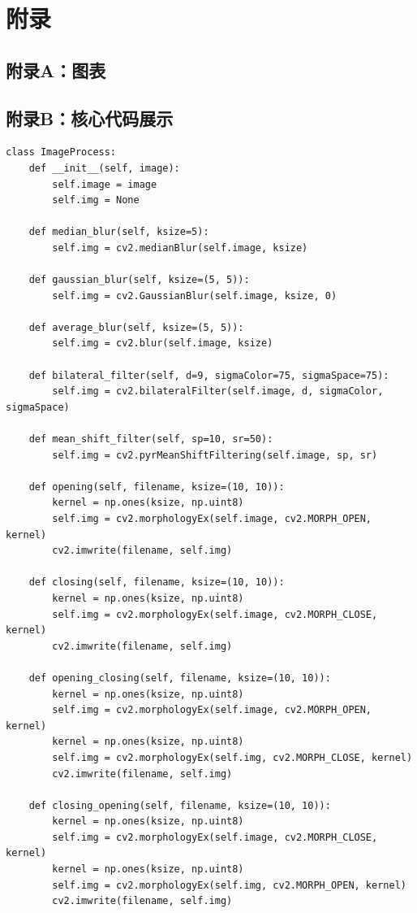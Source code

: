 \documentclass[12pt,hyperref,a4paper,UTF8]{ctexart}
\begin{document}
{{\section{附录}
\subsection*{附录A：图表}


\subsection*{附录B：核心代码展示}


\begin{mdframed}[style=codebox]
\begin{lstlisting}
class ImageProcess:
    def __init__(self, image):
        self.image = image
        self.img = None

    def median_blur(self, ksize=5):
        self.img = cv2.medianBlur(self.image, ksize)

    def gaussian_blur(self, ksize=(5, 5)):
        self.img = cv2.GaussianBlur(self.image, ksize, 0)

    def average_blur(self, ksize=(5, 5)):
        self.img = cv2.blur(self.image, ksize)

    def bilateral_filter(self, d=9, sigmaColor=75, sigmaSpace=75):
        self.img = cv2.bilateralFilter(self.image, d, sigmaColor, sigmaSpace)

    def mean_shift_filter(self, sp=10, sr=50):
        self.img = cv2.pyrMeanShiftFiltering(self.image, sp, sr)

    def opening(self, filename, ksize=(10, 10)):
        kernel = np.ones(ksize, np.uint8)
        self.img = cv2.morphologyEx(self.image, cv2.MORPH_OPEN, kernel)
        cv2.imwrite(filename, self.img)

    def closing(self, filename, ksize=(10, 10)):
        kernel = np.ones(ksize, np.uint8)
        self.img = cv2.morphologyEx(self.image, cv2.MORPH_CLOSE, kernel)
        cv2.imwrite(filename, self.img)

    def opening_closing(self, filename, ksize=(10, 10)):
        kernel = np.ones(ksize, np.uint8)
        self.img = cv2.morphologyEx(self.image, cv2.MORPH_OPEN, kernel)
        kernel = np.ones(ksize, np.uint8)
        self.img = cv2.morphologyEx(self.img, cv2.MORPH_CLOSE, kernel)
        cv2.imwrite(filename, self.img)

    def closing_opening(self, filename, ksize=(10, 10)):
        kernel = np.ones(ksize, np.uint8)
        self.img = cv2.morphologyEx(self.image, cv2.MORPH_CLOSE, kernel)
        kernel = np.ones(ksize, np.uint8)
        self.img = cv2.morphologyEx(self.img, cv2.MORPH_OPEN, kernel)
        cv2.imwrite(filename, self.img)
\end{lstlisting}
\end{mdframed}


}}
\end{document}
